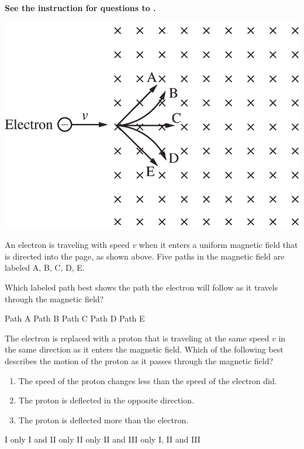 
\textbf{See the instruction for questions  to .} 

\begin{center}
    \includegraphics[scale=0.3]{images/img-014-026.png}
\end{center}

An electron is traveling with speed $v$ when it enters a uniform magnetic field that is directed into the page, as shown above. Five paths in the magnetic field are labeled A, B, C, D, E.

\begin{questions}
\setcounter{question}{28}

\question
Which labeled path best shows the path the electron will follow as it travels through the magnetic field?

\begin{oneparchoices}
    \choice Path A
    \choice Path B
    \choice Path C
    \choice Path D
    \choice Path E
\end{oneparchoices}


\question
The electron is replaced with a proton that is traveling at the same speed $v$ in the same direction as it enters the magnetic field. Which of the following best describes the motion of the proton as it passes through the magnetic field?

\begin{enumerate}
    \item The speed of the proton changes less than the speed of the electron did.
    \item The proton is deflected in the opposite direction.
    \item The proton is deflected more than the electron.
\end{enumerate}

\begin{oneparchoices}
    \choice I only
    \choice I and II only
    \choice II only
    \choice II and III only
    \choice I, II and III
\end{oneparchoices}

\end{questions}
